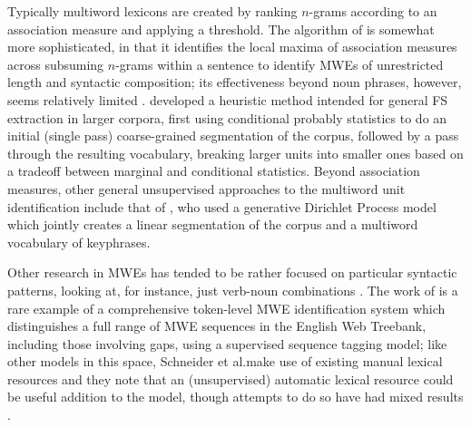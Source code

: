 \documentclass[11pt,letterpaper]{article}
\makeatletter
\def \al {al.\@ }
\makeatother
\begin{document}
Typically multiword lexicons are created by ranking $n$-grams according to an association measure and applying a threshold. The algorithm of  is somewhat more sophisticated, in that it identifies the local maxima of association measures across subsuming $n$-grams within a sentence to identify MWEs of unrestricted length and syntactic composition; its effectiveness beyond noun phrases, however, seems relatively limited \cite{Ramisch12}.  developed a heuristic method intended for general FS extraction in larger corpora, first using conditional probably statistics to do an initial (single pass) coarse-grained segmentation of the corpus, followed by a pass through the resulting vocabulary, breaking larger units into smaller ones based on a tradeoff between marginal and conditional statistics. Beyond association measures, other general unsupervised approaches to the multiword unit identification include that of , who used a generative Dirichlet Process model which jointly creates a linear segmentation of the corpus and a multiword vocabulary of keyphrases.

Other research in MWEs has tended to be rather focused on particular syntactic patterns, looking at, for instance, just verb-noun combinations \cite{Fazly09}. The work of  is a rare example of a comprehensive token-level MWE identification system which distinguishes a full range of MWE sequences in the English Web Treebank, including those involving gaps, using a supervised sequence tagging model; like other models in this space, Schneider et \al make use of existing manual lexical resources and they note that an (unsupervised) automatic lexical resource could be useful addition to the model, though attempts to do so have had mixed results \cite{Riedl16}. 
\end{document}
